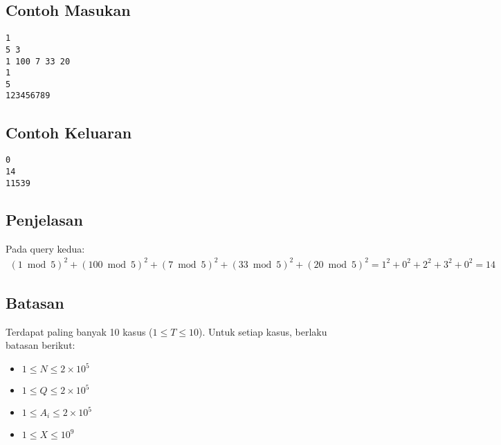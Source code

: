 \documentclass{article}
\begin{document}
\subsection*{Contoh Masukan}

\begin{lstlisting}
1
5 3
1 100 7 33 20
1
5
123456789
\end{lstlisting}

\subsection*{Contoh Keluaran}

\begin{lstlisting}
0
14
11539
\end{lstlisting}

\subsection*{Penjelasan}

\par Pada query kedua:
\begin{gather*} 
(1 \bmod 5)^2 + (100 \bmod 5)^2 + (7 \bmod 5)^2 + (33 \bmod 5)^2 + (20 \bmod 5)^2 = 1^2 + 0^2 + 2^2 + 3^2 + 0^2 = 14
\end{gather*} 

\subsection*{Batasan}

\par Terdapat paling banyak 10 kasus ($1 \leq T\leq 10$). Untuk setiap kasus, berlaku batasan berikut:
\begin{itemize}
	\item $1 \leq N\leq 2\times 10^5$
	\item $1 \leq Q\leq 2\times 10^5$
	\item $1 \leq A_i\leq 2\times 10^5$
	\item $1 \leq X \leq 10^9$
\end{itemize}
\end{document}
